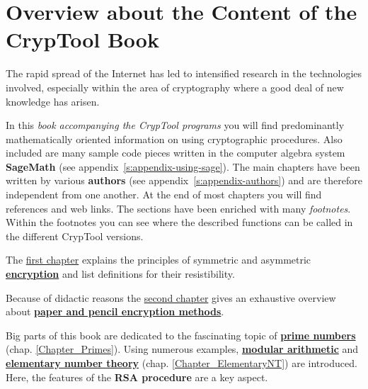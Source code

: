 %

\clearpage{}

\chapter*{Overview about the Content of the CrypTool Book}  

\parskip 4pt
The rapid spread of the Internet has led to intensified research in the
technologies involved, especially within the area of cryptography where a good
deal of new knowledge has arisen.

In this {\em book accompanying the CrypTool programs} 
you will find predominantly mathematically oriented information on using
cryptographic procedures. Also included are many sample code pieces written in the
computer algebra system {\bf SageMath} (see appendix~\ref{s:appendix-using-sage}).
The main chapters have been written by various {\bf authors}
(see appendix~\ref{s:appendix-authors})
and are therefore independent from one another. At the end of most chapters
you will find references and web links.
The sections have been enriched with many {\em footnotes}. Within the footnotes
you can see where the described functions can be called in the different CrypTool
versions.

The \hyperlink{Chapter_EncryptionSecDefinitions}{first chapter} explains the
principles of symmetric and asymmetric \hyperlink{Chapter_EncryptionSecDefinitions}
{\bf encryption} and list definitions for their resistibility.

Because of didactic reasons the \hyperlink{Chapter_PaperandPencil}
{second chapter} gives an exhaustive overview about
\hyperlink{Chapter_PaperandPencil}{\bf paper and pencil encryption methods}.

Big parts of this book are dedicated to the fascinating topic of 
\hyperlink{Chapter_Primes}{\bf prime numbers} (chap. \ref{Chapter_Primes}).
Using numerous examples, \hyperlink{Chapter_ElementaryNT}{\bf modular arithmetic}
and \hyperlink{Chapter_ElementaryNT}{\bf elementary number theory}
(chap. \ref{Chapter_ElementaryNT}) are introduced. Here, the features
of the {\bf RSA procedure} are a key aspect.

